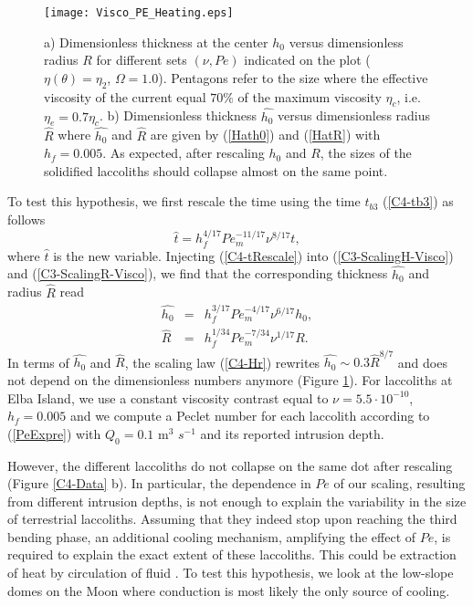 \begin{figure}[h!]
  \begin{center}
    \graphicspath{ {/Users/thorey/Documents/These/Projet/Refroidissement/Skin_Model/Figure/Figure_Heating/} }
    \texttt{[image: Visco\_PE\_Heating.eps]}
    \caption{a)  Dimensionless thickness  at the  center $h_0$  versus
      dimensionless radius $R$ for different sets $(\nu,Pe)$ indicated
      on  the plot  ($\eta(\theta)=\eta_2$, $\Omega=1.0$).   Pentagons
      refer to the  size where the effective viscosity  of the current
      equal   $70\%$  of   the   maximum   viscosity  $\eta_c$,   i.e.
      $\eta_e=0.7\eta_c$.   b)   Dimensionless  thickness  $\hat{h_0}$
      versus  dimensionless  radius  $\hat{R}$ where  $\hat{h_0}$  and
      $\hat{R}$  are  given  by (\ref{Hath0})  and  (\ref{HatR})  with
      $h_f=0.005$.  As  expected, after  rescaling $h_0$ and  $R$, the
      sizes of the solidified laccoliths should collapse almost on the
      same point. }
    \label{C4-Visco_PE_Heating}
  \end{center}
\end{figure}


To test  this hypothesis,  we first  rescale the  time using  the time
$t_{b3}$ (\ref{C4-tb3}) as follows
\begin{equation}
  \hat{t}= h_f^{4/17} Pe_m^{-11/17}\nu^{8/17}t,
  \label{C4-tRescale}
\end{equation}
where  $\hat{t}$ is  the new  variable. Injecting  (\ref{C4-tRescale})
into (\ref{C3-ScalingH-Visco}) and  (\ref{C3-ScalingR-Visco}), we find
that the corresponding thickness $\hat{h_0}$ and radius $\hat{R}$ read
\begin{eqnarray}
  \hat{h_0}&=& h_f^{3/17}Pe_m^{-4/17}\nu^{6/17}h_0,\label{Hath0}\\
  \hat{R}&=& h_f^{1/34}Pe_m^{-7/34}\nu^{1/17}R.\label{HatR}
\end{eqnarray}
In terms of  $\hat{h_0}$ and $\hat{R}$, the  scaling law (\ref{C4-Hr})
rewrites $ \hat{h_0} \sim 0.3\hat{R}^{8/7}$ and does not depend on the
dimensionless numbers anymore  (Figure \ref{C4-Visco_PE_Heating}). For
laccoliths at Elba Island, we  use a constant viscosity contrast equal
to  $\nu =  5.5\cdot 10^{-10}$,  $h_f=0.005$ and  we compute  a Peclet
number for each laccolith  according to (\ref{PeExpre}) with $Q_0=0.1$
m$^3$ $s^{-1}$ and its reported intrusion depth.  

However,  the different  laccoliths do  not collapse  on the  same dot
after  rescaling   (Figure  \ref{C4-Data}  b).   In   particular,  the
dependence in $Pe$ of our  scaling, resulting from different intrusion
depths,  is not  enough  to explain  the variability  in  the size  of
terrestrial laccoliths.  Assuming that  they indeed stop upon reaching
the third  bending phase, an additional  cooling mechanism, amplifying
the effect of  $Pe$, is required to explain the  exact extent of these
laccoliths.  This could be extraction  of heat by circulation of fluid
\citep{Senger:2014tt}.   To  test  this  hypothesis, we  look  at  the
low-slope domes on  the Moon where conduction is most  likely the only
source of cooling.

